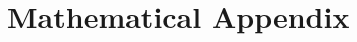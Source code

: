 \documentclass[12pt,american]{paper}
\theoremstyle{remark}
\begin{document}




\appendix
\section{Mathematical Appendix}\label{mathematical appendix}


\end{document}
